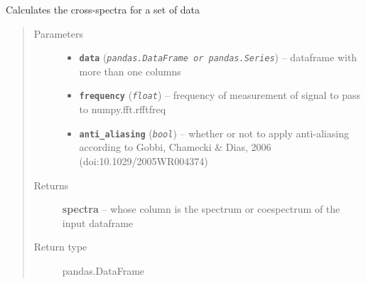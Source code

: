 \documentclass[a4paper,10pt,oneside]{sphinxmanual}
\begin{document}
\begin{fulllineitems}
\label{pymicra:pymicra.data.spectra}
Calculates the cross-spectra for a set of data
\begin{quote}\begin{description}
\item[{Parameters}] \leavevmode\begin{itemize}
\item {} 
\textbf{\texttt{data}} (\emph{\texttt{pandas.DataFrame or pandas.Series}}) -- dataframe with more than one columns

\item {} 
\textbf{\texttt{frequency}} (\emph{\texttt{float}}) -- frequency of measurement of signal to pass to numpy.fft.rfftfreq

\item {} 
\textbf{\texttt{anti\_aliasing}} (\emph{\texttt{bool}}) -- whether or not to apply anti-aliasing according to Gobbi, Chamecki \& Dias, 2006 (doi:10.1029/2005WR004374)

\end{itemize}

\item[{Returns}] \leavevmode
\textbf{spectra} -- whose column is the spectrum or coespectrum of the input dataframe

\item[{Return type}] \leavevmode
pandas.DataFrame

\end{description}\end{quote}

\end{fulllineitems}

\end{document}
